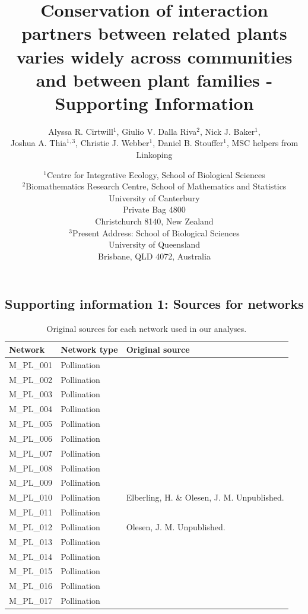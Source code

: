 \documentclass[12pt]{article}
\title{Conservation of interaction partners between related plants varies widely across communities and between plant families - Supporting Information}
\author{Alyssa R. Cirtwill$^{1}$, Giulio V. Dalla Riva$^{2}$, Nick J. Baker$^{1}$,\\
 Joshua A. Thia$^{1,3}$, Christie J. Webber$^{1}$, Daniel B. Stouffer$^{1}$, MSC helpers from Linkoping}
\date{\small$^1$Centre for Integrative Ecology, School of Biological Sciences\\
    \medskip$^2$Biomathematics Research Centre, School of Mathematics and Statistics\\
            University of Canterbury\\Private Bag 4800\\
Christchurch 8140, New Zealand\\
\medskip$^3$Present Address: School of Biological Sciences\\
University of Queensland\\Brisbane, QLD 4072, Australia }
\newcommand{\beginsupplement}{%
        \setcounter{table}{0}
        \renewcommand{\thetable}{S\arabic{table}}%
        \setcounter{figure}{0}
        \renewcommand{\thefigure}{S\arabic{figure}}%
     }
\begin{document}
\maketitle
\baselineskip=8.5mm
\begin{spacing}{1.0}

\beginsupplement
\clearpage

\section*{Supporting information 1: Sources for networks}
  \begin{table}[!h]
    \caption{Original sources for each network used in our analyses.}
    \label{sources}
    \begin{center}
    \begin{tabular}{|l l m{6cm} |}
    \hline
    Network & Network type & Original source \\
    \hline
    M\_PL\_001  & Pollination & \citep{Arroyo1982}  \\
    M\_PL\_002  & Pollination & \citep{Arroyo1982}  \\
    M\_PL\_003  & Pollination & \citep{Arroyo1982}  \\
    M\_PL\_004  & Pollination & \citep{Barrett1987} \\
    M\_PL\_005  & Pollination & \citep{Clements1923}  \\
    M\_PL\_006  & Pollination & \citep{Dicks2002} \\
    M\_PL\_007  & Pollination & \citep{Dicks2002} \\
    M\_PL\_008  & Pollination & \citep{Dupont2003}  \\
    M\_PL\_009  & Pollination & \citep{Elberling1999} \\
    M\_PL\_010  & Pollination & Elberling, H. \& Olesen, J. M. Unpublished. \\
    M\_PL\_011  & Pollination & \citep{Olesen2002a}  \\
    M\_PL\_012  & Pollination & Olesen, J. M. Unpublished.  \\
    M\_PL\_013  & Pollination & \citep{Ollerton2003}  \\
    M\_PL\_014  & Pollination & \citep{Hocking1968} \\
    M\_PL\_015  & Pollination & \citep{Petanidou1991} \\
    M\_PL\_016  & Pollination & \citep{Herrera1988} \\
    M\_PL\_017  & Pollination & \citep{Memmott1999} \\

\end{tabular}
\end{center}
\end{table}
\end{spacing}
\end{document}
